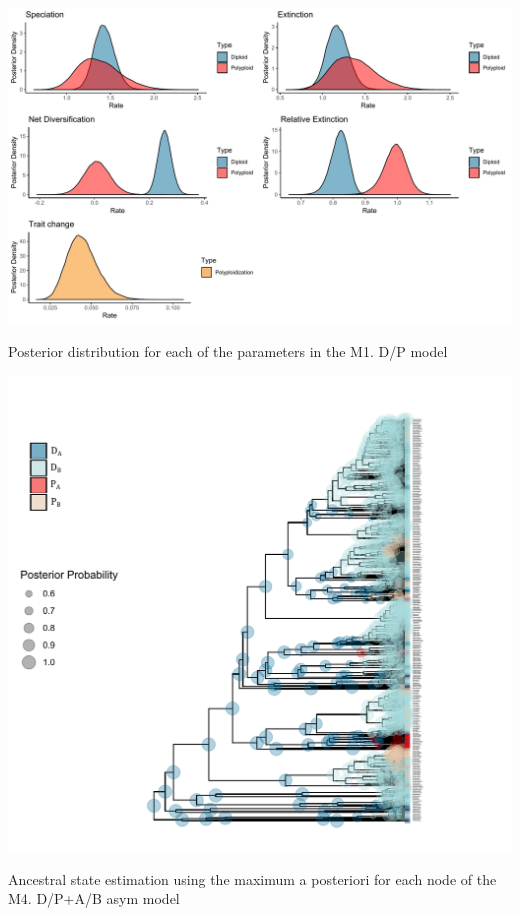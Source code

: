 \begin{suppfigure}
\includegraphics[width=\textwidth]{bisseDPnodipposteriordist.pdf}
\caption{Posterior distribution for each of the parameters in the M1. D/P model} %
\label{suppfigure:DPnodip}
\end{suppfigure}

\begin{suppfigure}
\includegraphics[width=\textwidth]{asrDPAB.pdf}
\caption{Ancestral state estimation using the maximum a posteriori for each node of the M4. D/P+A/B asym model} %
\label{suppfigure:DPnodipABasr}
\end{suppfigure}


